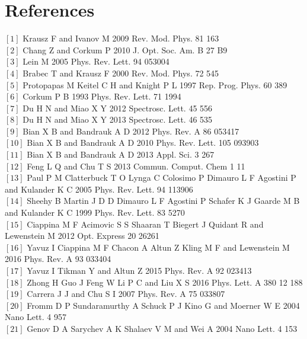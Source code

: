 \documentclass[%
reprint,
twocolumn,
 amsmath,amssymb,
 aps,
pra,
 showpacs
]{revtex4-1}
\begin{document}
\section{References}
\begin{thebibliography}{100}
$[1]$ Krausz F and Ivanov M 2009 Rev. Mod. Phys. 81 163\\
$[2]$ Chang Z and Corkum P 2010 J. Opt. Soc. Am. B  27 B9\\
$[3]$ Lein M 2005 Phys. Rev. Lett. 94 053004\\
$[4]$ Brabec T and Krausz F 2000 Rev. Mod. Phys. 72 545\\
$[5]$ Protopapas M Keitel C H and Knight P L 1997 Rep. Prog. Phys. 60 389\\
$[6]$ Corkum P B 1993 Phys. Rev. Lett. 71 1994\\
$[7]$ Du H N and Miao X Y 2012 Spectrosc. Lett. 45 556\\
$[8]$ Du H N and Miao X Y 2013 Spectrosc. Lett. 46 535\\
$[9]$ Bian X B and Bandrauk A D 2012 Phys. Rev. A 86 053417\\
$[10]$ Bian X B and Bandrauk A D 2010 Phys. Rev. Lett. 105 093903\\
$[11]$ Bian X B and Bandrauk A D 2013 Appl. Sci. 3 267 \\
$[12]$ Feng L Q and Chu T S 2013 Commun. Comput. Chem 1 11\\
$[13]$ Paul P M Clatterbuck T O Lynga C Colosimo P Dimauro L F Agostini P and Kulander K C 2005 Phys. Rev. Lett. 94 113906\\
$[14]$ Sheehy B Martin J D D Dimauro L F Agostini P Schafer K J Gaarde M B and Kulander K C 1999 Phys. Rev. Lett. 83 5270\\
$[15]$ Ciappina M F Acimovic S S Shaaran T Biegert J Quidant R and Lewenstein M 2012 Opt. Express 20 26261\\
$[16]$ Yavuz I Ciappina M F Chacon A Altun Z Kling M F and Lewenstein M 2016 Phys. Rev. A 93 033404\\
$[17]$ Yavuz I Tikman Y and Altun Z 2015 Phys. Rev. A 92 023413\\
$[18]$ Zhong H Guo J Feng W Li P C and Liu X S 2016 Phys. Lett. A 380 12 188\\
$[19]$ Carrera J J and Chu S I 2007 Phys. Rev. A 75 033807 \\
$[20]$ Fromm D P Sundaramurthy A Schuck P J Kino G and Moerner W E 2004 Nano Lett. 4 957\\
$[21]$ Genov D A Sarychev A K Shalaev V M and Wei A 2004 Nano Lett. 4 153\\

\end{thebibliography}
\end{document}
